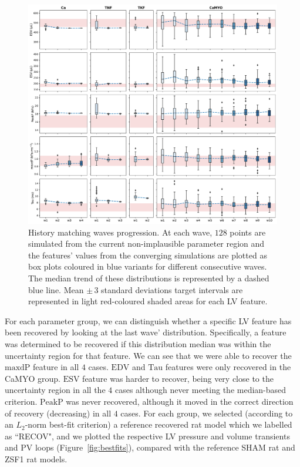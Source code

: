 \begin{figure}[ht!]
    \myfloatalign
    \includegraphics[width=\textwidth]{figures/chapter07/Fig_6.pdf}
    \caption{History matching waves progression. At each wave, $128$ points are simulated from the current non-implausible parameter region and the features' values from the converging simulations are plotted as box plots coloured in blue variants for different consecutive waves. The median trend of these distributions is represented by a dashed blue line. Mean $\pm\,3$ standard deviations target intervals are represented in light red-coloured shaded areas for each LV feature.}
    \label{fig:lvfeatsmatch}
\end{figure}

\vspace{0.2cm}
For each parameter group, we can distinguish whether a specific LV feature has been recovered by looking at the last wave' distribution. Specifically, a feature was determined to be recovered if this distribution median was within the uncertainty region for that feature. We can see that we were able to recover the $\textrm{maxdP}$ feature in all $4$ cases. $\textrm{EDV}$ and $\textrm{Tau}$ features were only recovered in the CaMYO group. $\textrm{ESV}$ feature was harder to recover, being very close to the uncertainty region in all the $4$ cases although never meeting the median-based criterion. $\textrm{PeakP}$ was never recovered, although it moved in the correct direction of recovery (decreasing) in all $4$ cases. For each group, we selected (according to an $L_2$-norm best-fit criterion) a reference recovered rat model which we labelled as ``RECOV", and we plotted the respective LV pressure and volume transients and PV loops (Figure~\ref{fig:bestfits}), compared with the reference SHAM rat and ZSF1 rat models.

